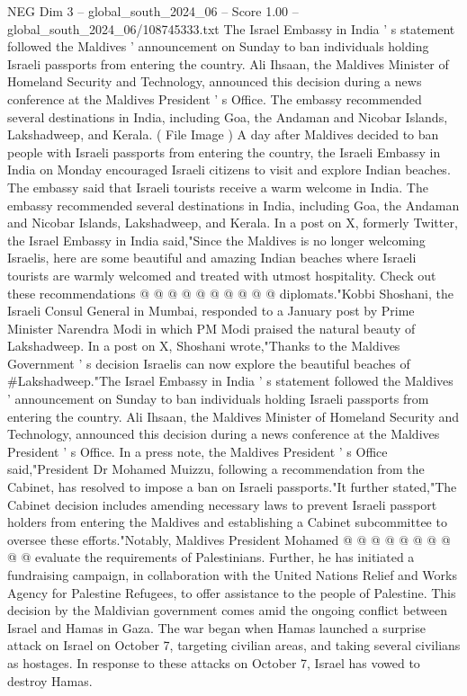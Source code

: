 \begin{textsample}{NEG Dim 3 – global\_south\_2024\_06 – Score 1.00 – global\_south\_2024\_06/108745333.txt}  \label{ex:f3_neg_120}
The Israel Embassy in India ' s statement followed the Maldives ' announcement on Sunday to ban individuals holding Israeli passports from entering the country.
Ali Ihsaan, the Maldives Minister of Homeland Security and Technology, announced this decision during a news conference at the Maldives President ' s Office.
The embassy recommended several destinations in India, including Goa, the Andaman and Nicobar Islands, Lakshadweep, and Kerala. ( File Image ) A day after Maldives decided to ban people with Israeli passports from entering the country, the Israeli Embassy in India on Monday encouraged Israeli citizens to visit and explore Indian beaches.
The embassy said that Israeli tourists receive a warm welcome in India.
The embassy recommended several destinations in India, including Goa, the Andaman and Nicobar Islands, Lakshadweep, and Kerala.
In a post on X, formerly Twitter, the Israel Embassy in India said,"Since the Maldives is no longer welcoming Israelis, here are some beautiful and amazing Indian beaches where Israeli tourists are warmly welcomed and treated with utmost hospitality.
Check out these recommendations @ @ @ @ @ @ @ @ @ @ diplomats."Kobbi Shoshani, the Israeli Consul General in Mumbai, responded to a January post by Prime Minister Narendra Modi in which PM Modi praised the natural beauty of Lakshadweep.
In a post on X, Shoshani wrote,"Thanks to the Maldives Government ' s decision Israelis can now explore the beautiful beaches of \#Lakshadweep."The Israel Embassy in India ' s statement followed the Maldives ' announcement on Sunday to ban individuals holding Israeli passports from entering the country.
Ali Ihsaan, the Maldives Minister of Homeland Security and Technology, announced this decision during a news conference at the Maldives President ' s Office.
In a press note, the Maldives President ' s Office said,"President Dr Mohamed Muizzu, following a recommendation from the Cabinet, has resolved to impose a ban on Israeli passports."It further stated,"The Cabinet decision includes amending necessary laws to prevent Israeli passport holders from entering the Maldives and establishing a Cabinet subcommittee to oversee these efforts."Notably, Maldives President Mohamed @ @ @ @ @ @ @ @ @ @ evaluate the requirements of Palestinians.
Further, he has initiated a fundraising campaign, in collaboration with the United Nations Relief and Works Agency for Palestine Refugees, to offer assistance to the people of Palestine.
This decision by the Maldivian government comes amid the ongoing conflict between Israel and Hamas in Gaza.
The war began when Hamas launched a surprise attack on Israel on October 7, targeting civilian areas, and taking several civilians as hostages.
In response to these attacks on October 7, Israel has vowed to destroy Hamas.

\end{textsample}
